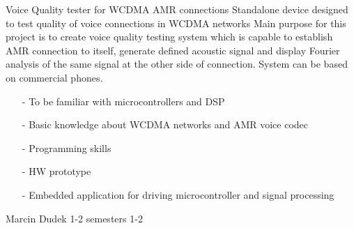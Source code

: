 \begin{project}
{Voice Quality tester for WCDMA AMR connections}
{
Standalone device designed to test quality of voice connections in WCDMA networks} 
{
Main purpose for this project is to create voice quality testing system which is capable to establish AMR connection to itself, generate defined acoustic signal and display Fourier analysis of the same signal at the other side of connection. System can be based on commercial phones.
}
{
\begin{itemize}
\item[-] To be familiar with microcontrollers and DSP
\item[-] Basic knowledge about WCDMA networks and AMR voice codec
\item[-] Programming skills
\item[-] HW prototype
\item[-] Embedded application for driving microcontroller and signal processing
\end{itemize} 
}
{Marcin Dudek}
{1-2 semesters}
{1-2}
\end{project}
